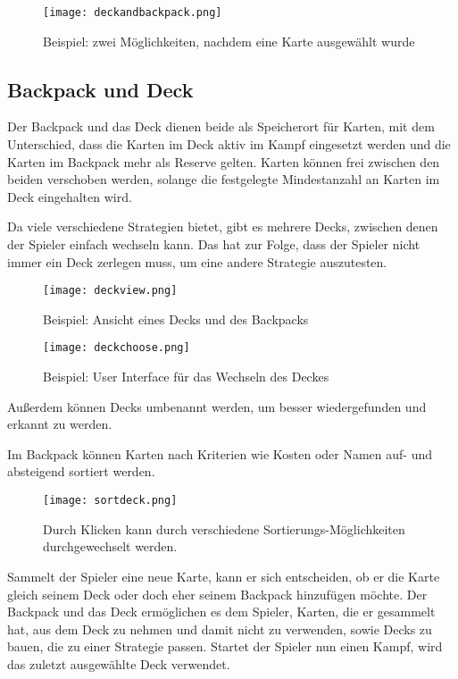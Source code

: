 \begin{figure}[H]
    \texttt{[image: deckandbackpack.png]}
    \caption{Beispiel: zwei Möglichkeiten, nachdem eine Karte ausgewählt wurde}
\end{figure}%

\subsection{Backpack und Deck}\label{backpack_and_deck}

Der Backpack und das Deck dienen beide als Speicherort für Karten, mit dem Unterschied, dass die Karten im Deck aktiv im
Kampf eingesetzt werden und die Karten im Backpack mehr als Reserve gelten.
Karten können frei zwischen den beiden verschoben werden, solange die festgelegte Mindestanzahl an Karten im Deck eingehalten wird.


Da \FF viele verschiedene Strategien bietet, gibt es mehrere Decks, zwischen denen der Spieler einfach wechseln kann.
Das hat zur Folge, dass der Spieler nicht immer ein Deck zerlegen muss, um eine andere Strategie auszutesten.

\begin{figure}[H]
    \texttt{[image: deckview.png]}
    \caption{Beispiel: Ansicht eines Decks und des Backpacks}
\end{figure}

\begin{figure}[H]
    \texttt{[image: deckchoose.png]}
    \caption{Beispiel: User Interface für das Wechseln des Deckes}
\end{figure}


Außerdem können Decks umbenannt werden, um besser wiedergefunden und erkannt zu werden.

Im Backpack können Karten nach Kriterien wie Kosten oder Namen auf- und absteigend sortiert werden.

\begin{figure}[H]
    \texttt{[image: sortdeck.png]}
    \caption{Durch Klicken kann durch verschiedene Sortierungs-Möglichkeiten durchgewechselt werden.}
\end{figure}

Sammelt der Spieler eine neue Karte, kann er sich entscheiden, ob er die Karte gleich seinem Deck oder doch eher seinem
Backpack hinzufügen möchte.
Der Backpack und das Deck ermöglichen es dem Spieler, Karten, die er gesammelt hat, aus dem Deck zu nehmen und damit
nicht zu verwenden, sowie Decks zu bauen, die zu einer Strategie passen.
Startet der Spieler nun einen Kampf, wird das zuletzt ausgewählte Deck verwendet.


